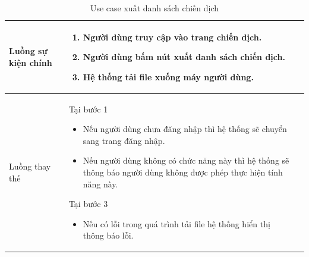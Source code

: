 \documentclass[12pt,a4paper]{article}
\begin{document}
\begin{table}[H]
\begin{tabular}{|p{3.5cm}|p{11.5cm}|c|}
            Luồng sự kiện chính & \vspace{-.8cm}\begin{enumerate}
                                                    \item Người dùng truy cập vào trang chiến dịch.
                                                    \item Người dùng bấm nút xuất danh sách chiến dịch.
                                                    \item Hệ thống tải file xuống máy người dùng.
            \end{enumerate}
            \\
            \hline
            Luồng thay thế & Tại bước 1\newline
            \vspace{-.8cm}\begin{itemize}
                              \item Nếu người dùng chưa đăng nhập thì hệ thống sẽ chuyển sang trang đăng nhập.
                              \item Nếu người dùng không có chức năng này thì hệ thống sẽ thông báo người dùng không được phép thực hiện tính năng này.
            \end{itemize}
            Tại bước 3\newline
            \vspace{-.8cm}\begin{itemize}
                              \item Nếu có lỗi trong quá trình tải file hệ thống hiển thị thông báo lỗi.
            \end{itemize}
            \\ \hline
        \end{tabular}
        \caption{Use case xuất danh sách chiến dịch}

    \end{table}


\end{document}
